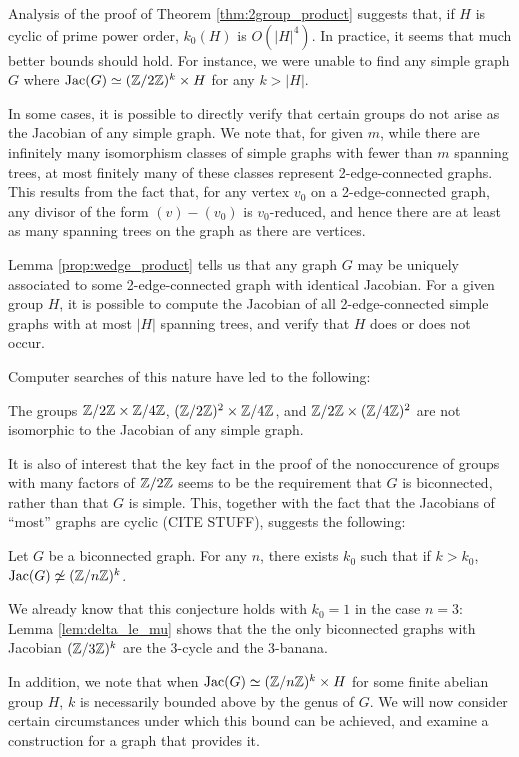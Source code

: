 \documentclass{amsart}
\begin{document}
Analysis of the proof of Theorem \ref{thm:2group_product} suggests
that, if $H$ is cyclic of prime power order, $k_0(H)$ is
$O(|H|^4)$. In practice, it seems that much better bounds should
hold. For instance, we were unable to find any simple graph $G$ where
$\operatorname{Jac}(G) \simeq (\mathbb{Z}/2\mathbb{Z})^k \times H$ for any $k > |H|$.

In some cases, it is possible to directly verify that certain groups
do not arise as the Jacobian of any simple graph. We note that, for
given $m$, while there are infinitely many isomorphism classes of
simple graphs with fewer than $m$ spanning trees, at most finitely
many of these classes represent 2-edge-connected graphs. This results
from the fact that, for any vertex $v_0$ on a 2-edge-connected graph,
any divisor of the form $(v) - (v_0)$ is $v_0$-reduced, and hence
there are at least as many spanning trees on the graph as there are
vertices.  

Lemma \ref{prop:wedge_product} tells us that any graph $G$ may be
uniquely associated to some 2-edge-connected graph with identical
Jacobian. For a given group $H$, it is possible to compute the
Jacobian of all 2-edge-connected simple graphs with at most $|H|$
spanning trees, and verify that $H$ does or does not occur. 

Computer searches of this nature have led to the following:

\begin{thm}
  The groups $\mathbb{Z}/2\mathbb{Z} \times \mathbb{Z}/4\mathbb{Z}$, $(\mathbb{Z}/2\mathbb{Z})^2 \times \mathbb{Z}/4\mathbb{Z}$, and
  $\mathbb{Z}/2\mathbb{Z} \times (\mathbb{Z}/4\mathbb{Z})^2$ are not isomorphic to the Jacobian of any
  simple graph.
\end{thm}

It is also of interest that the key fact in the proof of the
nonoccurence of groups with many factors of $\mathbb{Z}/2\mathbb{Z}$ seems to be the
requirement that $G$ is biconnected, rather than that $G$ is
simple. This, together with the fact that the Jacobians of ``most''
graphs are cyclic (CITE STUFF), suggests the following:

\begin{conj}
  Let $G$ be a biconnected graph. For any $n$, there exists $k_0$ such
  that if $k > k_0$, $\operatorname{Jac}(G) \not\simeq (\mathbb{Z}/n\mathbb{Z})^k$.
\end{conj}

We already know that this conjecture holds with $k_0 = 1$ in the case
$n=3$: Lemma \ref{lem:delta_le_mu} shows that the the only biconnected
graphs with Jacobian $(\mathbb{Z}/3\mathbb{Z})^k$ are the $3$-cycle and the
$3$-banana.

In addition, we note that when $\operatorname{Jac}(G) \simeq (\mathbb{Z}/n\mathbb{Z})^k \times H$
for some finite abelian group $H$, $k$ is necessarily bounded above by
the genus of $G$. We will now consider certain circumstances under
which this bound can be achieved, and examine a construction for a
graph that provides it.
\end{document}
